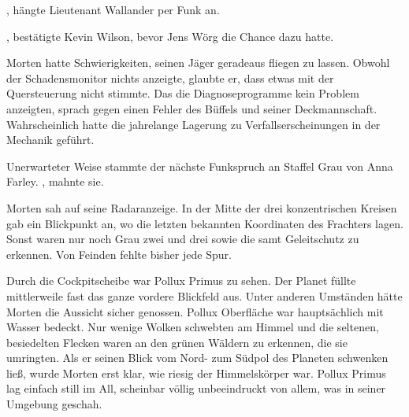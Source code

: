 \par

, hängte Lieutenant Wallander per Funk an. 

\par

, bestätigte Kevin Wilson, bevor Jens Wörg die Chance dazu hatte. 

\par

Morten hatte Schwierigkeiten, seinen Jäger geradeaus fliegen zu lassen. Obwohl der Schadensmonitor nichts anzeigte, glaubte er, dass etwas mit der Quersteuerung nicht stimmte. Das die Diagnoseprogramme kein Problem anzeigten, sprach gegen einen Fehler des Büffels und seiner Deckmannschaft. Wahrscheinlich hatte die jahrelange Lagerung zu Verfallserscheinungen in der Mechanik geführt.

\par

Unerwarteter Weise stammte der nächste Funkspruch an Staffel Grau von Anna Farley. , mahnte sie. 

\par

Morten sah auf seine Radaranzeige. In der Mitte der drei konzentrischen Kreisen gab ein Blickpunkt an, wo die letzten bekannten Koordinaten des Frachters lagen. Sonst waren nur noch Grau zwei und drei sowie die  samt Geleitschutz zu erkennen. Von Feinden fehlte bisher jede Spur.

\par

Durch die Cockpitscheibe war Pollux Primus zu sehen. Der Planet füllte mittlerweile fast das ganze vordere Blickfeld aus. Unter anderen Umständen hätte Morten die Aussicht sicher genossen. Pollux Oberfläche war hauptsächlich mit Wasser bedeckt. Nur wenige Wolken schwebten am Himmel und die seltenen, besiedelten Flecken waren an den grünen Wäldern zu erkennen, die sie umringten. Als er seinen Blick vom Nord- zum Südpol des Planeten schwenken ließ, wurde Morten erst klar, wie riesig der Himmelskörper war. Pollux Primus lag einfach still im All, scheinbar völlig unbeeindruckt von allem, was in seiner Umgebung geschah.

